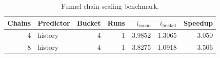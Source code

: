 \begin{table}[t]
\centering
\caption{Funnel chain-scaling benchmark.}
\label{tab:chain-scaling}
\begin{tabular}{rlrrrrr}
\hline
Chains & Predictor & Bucket & Runs & $t_{\mathrm{mono}}$ & $t_{\mathrm{bucket}}$ & Speedup \\
\hline
4 & history & 4 & 1 & 3.9852 & 1.3065 & 3.050 \\
8 & history & 4 & 1 & 3.8275 & 1.0918 & 3.506 \\
\hline
\end{tabular}
\end{table}
